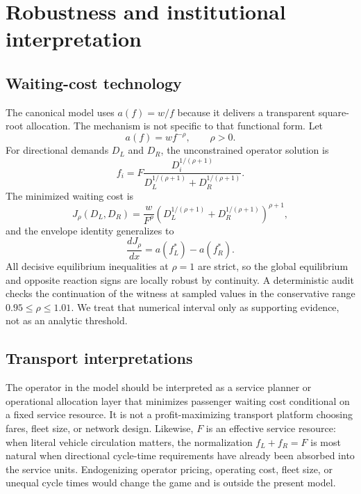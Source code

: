 \section{Robustness and institutional interpretation}\label{sec:robustness}

\subsection{Waiting-cost technology}

The canonical model uses $a(f)=w/f$ because it delivers a transparent square-root allocation. The mechanism is not specific to that functional form. Let
\begin{equation}
a(f)=w f^{-\rho},\qquad \rho>0.
\label{eq:power_waiting}
\end{equation}
For directional demands $D_L$ and $D_R$, the unconstrained operator solution is
\begin{equation}
f_i
=F\frac{D_i^{1/(\rho+1)}}{D_L^{1/(\rho+1)}+D_R^{1/(\rho+1)}}.
\label{eq:power_allocation}
\end{equation}
The minimized waiting cost is
\begin{equation}
J_\rho(D_L,D_R)
=\frac{w}{F^\rho}
\left(D_L^{1/(\rho+1)}+D_R^{1/(\rho+1)}\right)^{\rho+1},
\end{equation}
and the envelope identity generalizes to
\begin{equation}
\frac{dJ_\rho}{dx}=a(f_L^*)-a(f_R^*).
\label{eq:power_envelope}
\end{equation}
All decisive equilibrium inequalities at $\rho=1$ are strict, so the global equilibrium and opposite reaction signs are locally robust by continuity. A deterministic audit checks the continuation of the witness at sampled values in the conservative range $0.95\leq\rho\leq1.01$. We treat that numerical interval only as supporting evidence, not as an analytic threshold.

\subsection{Transport interpretations}

The operator in the model should be interpreted as a service planner or operational allocation layer that minimizes passenger waiting cost conditional on a fixed service resource. It is not a profit-maximizing transport platform choosing fares, fleet size, or network design. Likewise, $F$ is an effective service resource: when literal vehicle circulation matters, the normalization $f_L+f_R=F$ is most natural when directional cycle-time requirements have already been absorbed into the service units. Endogenizing operator pricing, operating cost, fleet size, or unequal cycle times would change the game and is outside the present model.

